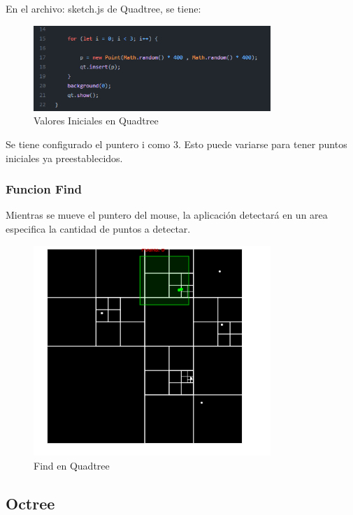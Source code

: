 \documentclass{article}
\begin{document}
En el archivo: sketch.js de Quadtree, se tiene:

\begin{figure}[H]
\centering
\includegraphics[width=0.8\textwidth]{img/quad_puntosinciales.png}
\caption{Valores Iniciales en Quadtree}
\end{figure}

Se tiene configurado el puntero i como 3. Esto puede variarse para tener puntos iniciales ya preestablecidos.

\subsubsection{Funcion Find}

Mientras se mueve el puntero del mouse, la aplicación detectará en un area especifica la cantidad de puntos a detectar.

\begin{figure}[H]
\centering
\includegraphics[width=0.8\textwidth]{img/quad_found.PNG}
\caption{Find en Quadtree}
\end{figure}


\subsection{Octree}
\end{document}
